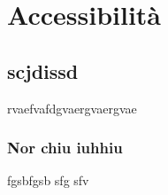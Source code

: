 \section{Accessibilità}
	\subsection{scjdissd}
	rvaefvafdgvaergvaergvae
		\subsubsection{Nor chiu iuhhiu}
		fgsbfgsb sfg sfv 
		
		


